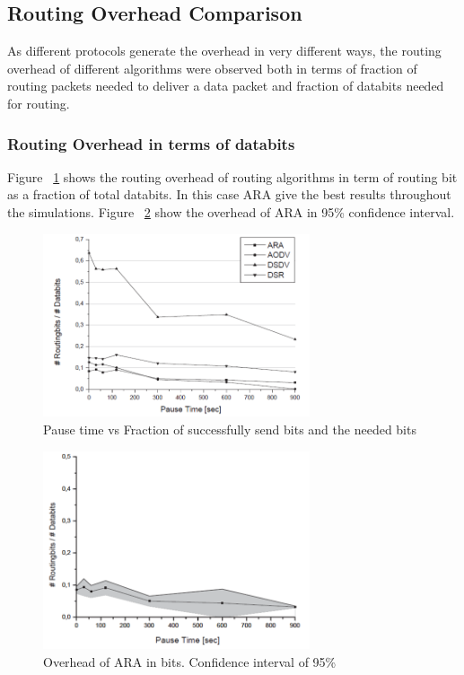 \subsection{Routing Overhead Comparison}
As different protocols generate the overhead in very different ways, the routing overhead of different algorithms were observed both in terms of fraction of routing packets needed to deliver a data packet and fraction of databits needed for routing.
\subsubsection{Routing Overhead in terms of databits}
Figure ~\ref{fig:picture3} shows the routing overhead of routing algorithms in term of routing bit as a fraction of total databits. In this case ARA give the best results throughout the simulations. Figure ~\ref{fig:picture4} show the overhead of ARA in 95\% confidence interval.
  
\begin{figure}[t!]
\centering
\includegraphics[width=0.7\textwidth]{Picture3.png}
\caption{\label{fig:picture3}Pause time vs Fraction of successfully send bits and the needed bits}
\end{figure}

\begin{figure}[t!]
\centering
\includegraphics[width=0.7\textwidth]{Picture4.png}
\caption{\label{fig:picture4}Overhead of ARA in bits. Confidence interval of 95\%}
\end{figure}



